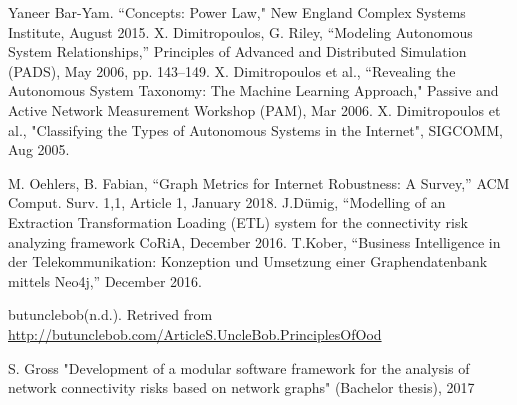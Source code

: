 \documentclass[conference, 11pt]{IEEEtran}
\begin{document}
\begin{thebibliography}{00}



 

 Yaneer Bar-Yam. ``Concepts: Power Law," New England Complex Systems Institute, August 2015.
X. Dimitropoulos, G. Riley, ``Modeling Autonomous System Relationships,'' Principles of Advanced and Distributed Simulation (PADS), May 2006, pp. 143--149.
X. Dimitropoulos et al., ``Revealing the Autonomous System Taxonomy: The Machine Learning Approach," Passive and Active Network Measurement Workshop (PAM), Mar 2006.
X. Dimitropoulos et al., "Classifying the Types of Autonomous Systems in the Internet", SIGCOMM, Aug 2005.







M. Oehlers, B. Fabian, ``Graph Metrics for Internet Robustness: A Survey,'' ACM Comput. Surv. 1,1, Article 1, January 2018.
J.Dümig, ``Modelling of an Extraction Transformation Loading (ETL) system for the connectivity risk analyzing framework CoRiA, December 2016.
T.Kober, ``Business Intelligence in der Telekommunikation: Konzeption und Umsetzung einer Graphendatenbank mittels Neo4j,'' December 2016.

butunclebob(n.d.). Retrived from \url{http://butunclebob.com/ArticleS.UncleBob.PrinciplesOfOod}

 S. Gross "Development of a modular software framework for the analysis of network
connectivity risks based on network graphs" (Bachelor thesis), 2017


\end{thebibliography}
\end{document}
